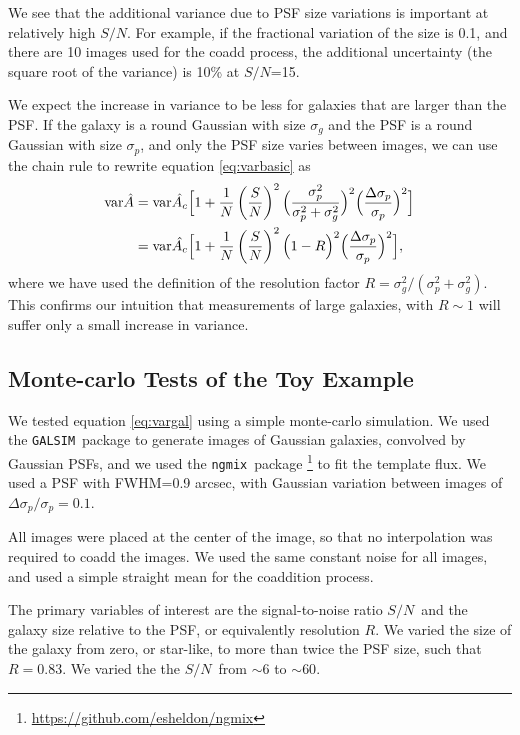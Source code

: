 \documentclass[a4paper,fleqn,usenatbib,referee]{mnras}
\newcommand{\galsim}{\texttt{GALSIM}}
\newcommand{\ngmix}{\texttt{ngmix}}
\newcommand{\snr}{$S/N$}
\begin{document}
We see that the additional variance due to PSF size variations is important
at relatively high \snr.  For example, if the fractional variation of
the size is 0.1, and there are 10 images used for the coadd process,
the additional uncertainty (the square root of the variance)
is 10\% at \snr=15.

We expect the increase in variance to be less for galaxies that
are larger than the PSF.  If the galaxy is a round Gaussian with
size $\sigma_g$ and the PSF is a round Gaussian with size $\sigma_p$,
and only the PSF size varies between images,
we can use the chain rule to rewrite equation \ref{eq:varbasic} as
\begin{align} \label{eq:vargal}
    {\rm var}\hat{A} &= {\rm var}\hat{A_c} \Bigl[ 1 + 
        \frac{1}{N} \left( \frac{S}{N} \right)^2 \Bigl(\frac{\sigma_p^2}{\sigma_p^2 + \sigma_g^2} \Bigr)^2 \Bigl( \frac{\Delta \sigma_p}{\sigma_p} \Bigr)^2 \Bigr] \\
     &= {\rm var}\hat{A_c} \Bigl[ 1 + 
        \frac{1}{N} \left( \frac{S}{N} \right)^2 \Bigl(1 - R \Bigr)^2 \Bigl( \frac{\Delta \sigma_p}{\sigma_p} \Bigr)^2 \Bigr],
\end{align}
where we have used the definition of the resolution factor $R =
\sigma_g^2/(\sigma_p^2 + \sigma_g^2)$.  This confirms our
intuition that measurements of large galaxies, with $R \sim 1$ will suffer
only a small increase in variance.

\subsection{Monte-carlo Tests of the Toy Example} \label{sec:toymc}

We tested equation \ref{eq:vargal} using a simple monte-carlo simulation.  We
used the \galsim\ package to generate images of Gaussian galaxies, convolved by
Gaussian PSFs, and we used the \ngmix\ package
\footnote{\url{https://github.com/esheldon/ngmix}} to fit the template flux.
We used a PSF with FWHM=0.9 arcsec, with Gaussian variation between images
of $\Delta \sigma_p/\sigma_p = 0.1$.

All images were placed at the center of the image, so that no interpolation was
required to coadd the images.  We used the same constant noise for all images,
and used a simple straight mean for the coaddition process.

The primary variables of interest are the signal-to-noise ratio \snr\ and the
galaxy size relative to the PSF, or equivalently resolution $R$.  We varied the
size of the galaxy from zero, or star-like, to more than twice the PSF size,
such that$R = 0.83$. We varied the the \snr\ from $\sim 6$ to $\sim 60$.
\end{document}
